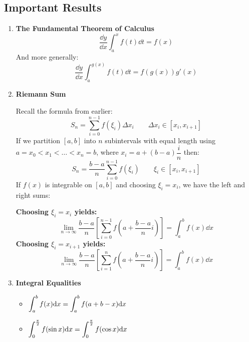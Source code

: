 \documentclass[12pt]{article}
\begin{document}
\subsection{Important Results}
\begin{enumerate}
    \item \textbf{The Fundamental Theorem of Calculus}
    \begin{equation*}
        \dfrac{\dd y}{\dd x}\int_a^x f(t) \dd t = f(x)
    \end{equation*}
    And more generally:
    \begin{equation*}
        \dfrac{\dd y}{\dd x}\int_a^{g(x)} f(t) \dd t = f(g(x))g'(x)
    \end{equation*}  
    \item \textbf{Riemann Sum}
    \par Recall the formula from earlier:
    \begin{equation*}
        S_n = \sum_{i=0}^{n-1}f(\xi_i) \Delta x_i \qquad  \Delta x_i \in [x_i, x_{i+1}]
    \end{equation*}
    If we partition $[a,b]$ into $n$ subintervals with equal length using $a = x_0 < x_1 < \ldots < x_n = b$, where $x_i = a + (b-a)\dfrac{i}{n}$ then:
    \begin{equation*}
        S_n = \dfrac{b-a}{n} \sum_{i=0}^{n-1}f(\xi_i) \qquad  \xi_i \in [x_i, x_{i+1}]
    \end{equation*}
    If $f(x)$ is integrable on $[a,b]$ and choosing $\xi_i = x_i$, we have the left and right sums:
    \begin{important}
    \textbf{Choosing $\xi_i = x_i$ yields:}
    \begin{equation*}
        \lim_{n \rightarrow \infty} \dfrac{b-a}{n} \left[ \sum_{i=0}^{n-1}f\left(a+ \dfrac{b-a}{n}i \right)\right] = \int_a^b f(x) \dd x
    \end{equation*}
    \textbf{Choosing $\xi_i = x_{i+1}$ yields:}
    \begin{equation*}
        \lim_{n \rightarrow \infty} \dfrac{b-a}{n} \left[ \sum_{i=1}^{n}f\left(a+ \dfrac{b-a}{n}i \right)\right] = \int_a^b f(x) \dd x
    \end{equation*}
    \end{important}
    \item \textbf{Integral Equalities}
    \begin{itemize}
        \item $\mathlarger{\int_a^b f(x) \dd x = \int_a^b f(a+b-x) \dd x}$
        \item $\mathlarger{\int_0^{\frac{\pi}{2}}f(\sin x) \dd x = \int_0^{\frac{\pi}{2}}f(\cos x) \dd x}$

\end{itemize}
\end{enumerate}
\end{document}
